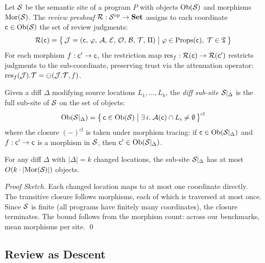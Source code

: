 \documentclass[11pt]{article}
\newcommand{\ReviewJudg}{\mathcal{R}}
\begin{document}
\begin{definition}\label{def:review-presheaf}
Let $\mathcal{S}$ be the semantic site of a program $P$ with objects $\mathrm{Ob}(\mathcal{S})$
and morphisms $\mathrm{Mor}(\mathcal{S})$. The \emph{review presheaf}
$\ReviewJudg : \Site^{\mathrm{op}} \to \mathbf{Set}$ assigns to each
coordinate $\mathsf{c} \in \mathrm{Ob}(\mathcal{S})$ the set of review judgments:
\[
  \ReviewJudg(\coord) = \bigl\{\,
    \J = \Jud{\coord}{\prop}{\carrier}{\evid}{\oblig}{\obstr}{\trust}{\prov}
    \;\big|\;
    \prop \in \mathrm{Props}(\coord),\;
    \trust \in \Talg
  \,\bigr\}
\]
For each morphism $f : \mathsf{c}' \to \mathsf{c}$, the restriction map
$\res_f : \ReviewJudg(\coord) \to \ReviewJudg(\coord')$ restricts
judgments to the sub-coordinate, preserving trust via the attenuation
operator: $\mathrm{res}_f(\mathcal{J}).\mathcal{T} = \ominus(\mathcal{J}.\mathcal{T}, f)$.
\end{definition}

\begin{definition}\label{def:diff-subsite}
Given a diff $\Delta$ modifying source locations $L_1, \ldots, L_k$, the
\emph{diff sub-site} $\mathcal{S}|_\Delta$ is the full sub-site of $\mathcal{S}$ on
the set of objects:
\[
  \mathrm{Ob}(\mathcal{S}|_\Delta) = \bigl\{\,
    \mathsf{c} \in \mathrm{Ob}(\mathcal{S})
    \;\big|\;
    \exists\, i.\; \mathcal{A}(\mathsf{c}) \cap L_i \neq \emptyset
  \,\bigr\}^{\mathrm{cl}}
\]
where the closure $(-)^{\mathrm{cl}}$ is taken under morphism tracing:
if $\mathsf{c} \in \mathrm{Ob}(\mathcal{S}|_\Delta)$ and $f : \mathsf{c}' \to \mathsf{c}$ is a
morphism in $\mathcal{S}$, then $\mathsf{c}' \in \mathrm{Ob}(\mathcal{S}|_\Delta)$.
\end{definition}

\begin{proposition}\label{prop:subsite-finite}
For any diff $\Delta$ with $|\Delta| = k$ changed locations, the sub-site
$\mathcal{S}|_\Delta$ has at most $O(k \cdot |\mathrm{Mor}(\mathcal{S})|)$ objects.
\end{proposition}

\begin{proof}[Proof Sketch]
Each changed location maps to at most one coordinate directly. The
transitive closure follows morphisms, each of which is traversed at most
once. Since $\mathcal{S}$ is finite (all programs have finitely many coordinates),
the closure terminates. The bound follows from the morphism count: across
our benchmarks, \compSiteMeanMorphisms{} mean morphisms per site. \qed
\end{proof}

\subsection{Review as Descent}
\end{document}
